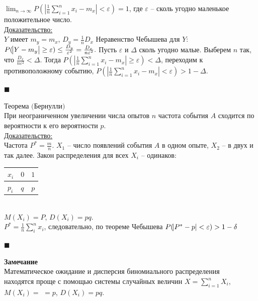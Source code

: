 \documentclass[russian, 12pt, fleqn]{article}
\begin{document}
$\displaystyle{  \lim_{n\to{\infty}}  }  \displaystyle{ P(\left\lvert\frac{1}{n} \sum\limits_{i = 1}^{n} x_i - m_x \right\rvert < \varepsilon) = 1}$, где $ \varepsilon$ --  сколь угодно маленькое положительное число.\\
\underline{Доказательство:}\\
$Y$ имеет $m_y=m_x$, $D_y = \frac{1}{n}D_x$ Неравенство Чебышева для $Y$:\\ $P(\abs{Y-m_y} \geq \varepsilon) \leq \frac{D_y}{\varepsilon^2} = \frac{D_x}{n\varepsilon^2}.$
Пусть $\varepsilon$ и $\Delta$ сколь угодно малые. Выберем $n$ так, что $\frac{D_x}{n\varepsilon^2} < \Delta$. Тогда $\displaystyle{P(\left\lvert\frac{1}{n}  \sum\limits_{i = 1}^{n} x_i - m_x\right\rvert \geq \varepsilon) < \Delta}$, переходим к противоположному событию,  $\displaystyle{P(\left\lvert\frac{1}{n}  \sum\limits_{i = 1}^{n} x_i - m_x\right\rvert < \varepsilon) > 1 - \Delta}$.\\
\begin{flushright}\(\blacksquare\)\end{flushright}
$\textbf{Теорема (Бернулли)}$\\
При неограниченном увеличении числа опытов $n$ частота события $A$ сходится по вероятности к его вероятности $p$.\\
\underline{Доказательство:}\\
Частота $P^* = \frac{m}{n}$. $X_1$ -- число появлений события $A$ в одном опыте, $X_2$ --  в двух и так далее. Закон распределения для всех $X_i$ -- одинаков:\\
\begin{tabular}[b]{ | l | l |  l |  }
\hline
$ x_i$ & $0$ & $1$   \\
\hline
  $p_i$   & $q$  & $p$   \\
\hline
\end{tabular}\\
$M(X_i) = P$, $D(X_i) = pq$.\\
$P^* = \frac{1}{n} \displaystyle{\sum_{i}^{n}} x_i$,  следовательно, по теореме Чебышева $P(\abs{P^* - p} < \varepsilon) > 1 - \delta$\\
\begin{flushright}\(\blacksquare\)\end{flushright}
\textbf{Замечание\ } \\
Математическое ожидание и дисперсия биномиального распределения \\ находятся проще с помощью системы случайных величин $X = \displaystyle{\sum\limits_{i = 1}^{n}} X_i$, 
$M(X_i) = $ $=p$, $D(X_i) = pq$.
\end{document}
